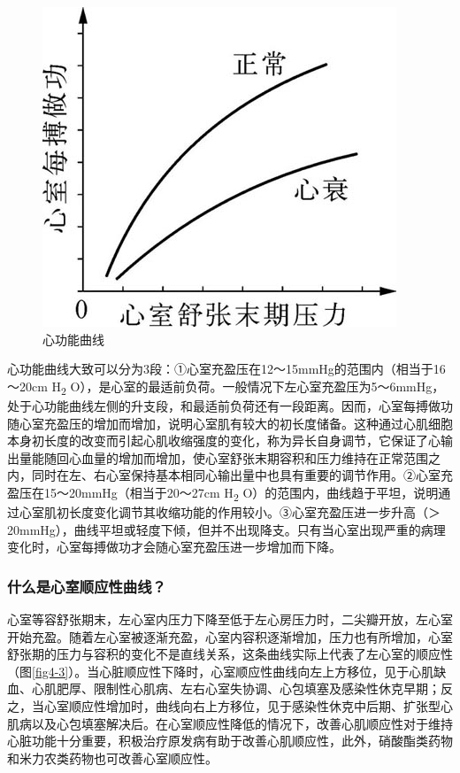 \protect\hypertarget{text00010.htmlux5cux23ck001}{}{}
\begin{figure}[!htbp]
 \centering
 \includegraphics{./images/Image00029.jpg}
 \captionsetup{justification=centering}
 \caption{心功能曲线}
 \label{fig4-2}
  \end{figure} 

心功能曲线大致可以分为3段：①心室充盈压在12～15mmHg的范围内（相当于16～20cm
H\textsubscript{2}
O），是心室的最适前负荷。一般情况下左心室充盈压为5～6mmHg，处于心功能曲线左侧的升支段，和最适前负荷还有一段距离。因而，心室每搏做功随心室充盈压的增加而增加，说明心室肌有较大的初长度储备。这种通过心肌细胞本身初长度的改变而引起心肌收缩强度的变化，称为异长自身调节，它保证了心输出量能随回心血量的增加而增加，使心室舒张末期容积和压力维持在正常范围之内，同时在左、右心室保持基本相同心输出量中也具有重要的调节作用。②心室充盈压在15～20mmHg（相当于20～27cm
H\textsubscript{2}
O）的范围内，曲线趋于平坦，说明通过心室肌初长度变化调节其收缩功能的作用较小。③心室充盈压进一步升高（＞20mmHg），曲线平坦或轻度下倾，但并不出现降支。只有当心室出现严重的病理变化时，心室每搏做功才会随心室充盈压进一步增加而下降。

\subsubsection{什么是心室顺应性曲线？}

心室等容舒张期末，左心室内压力下降至低于左心房压力时，二尖瓣开放，左心室开始充盈。随着左心室被逐渐充盈，心室内容积逐渐增加，压力也有所增加，心室舒张期的压力与容积的变化不是直线关系，这条曲线实际上代表了左心室的顺应性（图\ref{fig4-3}）。当心脏顺应性下降时，心室顺应性曲线向左上方移位，见于心肌缺血、心肌肥厚、限制性心肌病、左右心室失协调、心包填塞及感染性休克早期；反之，当心室顺应性增加时，曲线向右上方移位，见于感染性休克中后期、扩张型心肌病以及心包填塞解决后。在心室顺应性降低的情况下，改善心肌顺应性对于维持心脏功能十分重要，积极治疗原发病有助于改善心肌顺应性，此外，硝酸酯类药物和米力农类药物也可改善心室顺应性。

